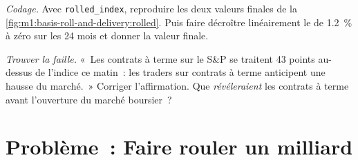 \begin{exercise}[$\star\star\star$]\label{exo:m1:basis-roll-and-delivery:7}
\emph{Codage.} Avec \texttt{rolled\_index}, reproduire les deux valeurs finales de la
\cref{fig:m1:basis-roll-and-delivery:rolled}. Puis faire décroître linéairement le 
de 1.2~\% à zéro sur les 24 mois et donner la valeur finale.
\end{exercise}

\begin{exercise}[$\star\star\star$]\label{exo:m1:basis-roll-and-delivery:8}
\emph{Trouver la faille.} «~Les contrats à terme sur le S\&P se traitent 43 points au-dessus de l'indice
ce matin~: les traders sur contrats à terme anticipent une hausse du marché.~» Corriger
l'affirmation. Que \emph{révéleraient} les contrats à terme avant l'ouverture du marché
boursier~?
\end{exercise}

\section{Problème~: Faire rouler un milliard}

